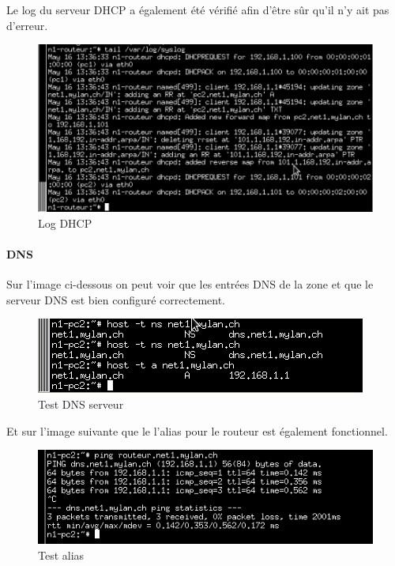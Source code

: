 \documentclass{article}
\begin{document}
Le log du serveur DHCP a également été vérifié afin d'être sûr qu'il n'y ait pas d'erreur.

\begin{figure}[h]
	\centering
	\includegraphics{./captures/2-log-dhcp.png}
	\caption{Log DHCP}
	\label{fig:Log DHCP}
\end{figure}

\paragraph{DNS}

Sur l'image ci-dessous on peut voir que les entrées DNS de la zone et que le serveur DNS est bien configuré correctement.

\begin{figure}[h]
	\centering
	\includegraphics{./captures/1-testrouteur-dns1-pc2.png}
	\caption{Test DNS serveur}
	\label{fig:Test DNS serveur}
\end{figure}

Et sur l'image suivante que le l'alias pour le routeur est également fonctionnel.

\begin{figure}[h]
	\centering
	\includegraphics{./captures/alias-routeur.png}
	\caption{Test alias}
	\label{fig:Test alias}
\end{figure}
\end{document}
